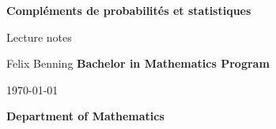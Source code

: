 \clearpage
\begin{titlepage}
\begin{center}
\vfill

\begin{figure}[ht]
\begin{center}
	
\end{center}
\end{figure}

\vfill

{
   \Huge\textbf{
	Compl\'ements de probabilit\'es et statistiques
   }
}
\par\vspace{\baselineskip}
{
\Large Lecture notes\par
}

\vfill
\par\vspace{\baselineskip}
{\LARGE Felix Benning}
\vfill
{\Large \textbf{Bachelor in Mathematics Program}}
\par\vspace{\baselineskip}
{\Large \today}
\par\vspace{\baselineskip}
{\Large \textbf{Department of Mathematics}}
\end{center}
\end{titlepage}